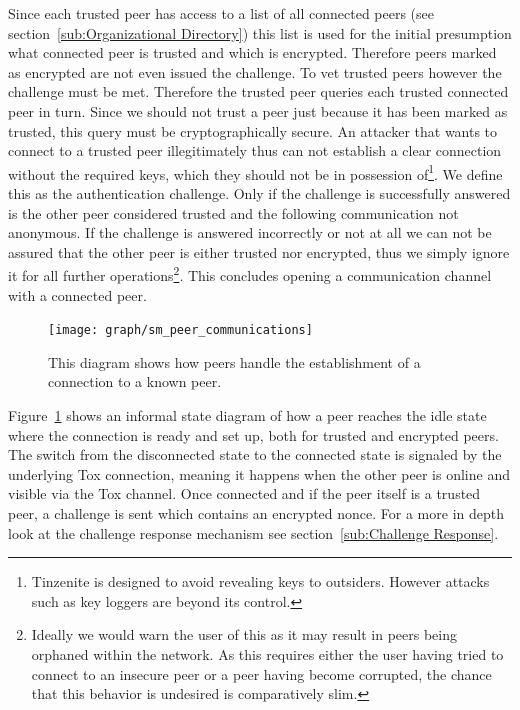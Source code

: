 Since each trusted peer has access to a list of all connected peers (see section~\ref{sub:Organizational Directory}) this list is used for the initial presumption what connected peer is trusted and which is encrypted.
Therefore peers marked as encrypted are not even issued the challenge.
To vet trusted peers however the challenge must be met.
Therefore the trusted peer queries each trusted connected peer in turn.
Since we should not trust a peer just because it has been marked as trusted, this query must be cryptographically secure.
An attacker that wants to connect to a trusted peer illegitimately thus can not establish a clear connection without the required keys, which they should not be in possession of\footnote{Tinzenite is designed to avoid revealing keys to outsiders. However attacks such as key loggers are beyond its control.}.
We define this as the authentication challenge.
Only if the challenge is successfully answered is the other peer considered trusted and the following communication not anonymous.
If the challenge is answered incorrectly or not at all we can not be assured that the other peer is either trusted nor encrypted, thus we simply ignore it for all further operations\footnote{Ideally we would warn the user of this as it may result in peers being orphaned within the network. As this requires either the user having tried to connect to an insecure peer or a peer having become corrupted, the chance that this behavior is undesired is comparatively slim.}.
This concludes opening a communication channel with a connected peer.

\begin{figure}[htp]
\centering
    \texttt{[image: graph/sm\_peer\_communications]}
\caption[Connection State Diagram]{This diagram shows how peers handle the establishment of a connection to a known peer.}
\label{graph:connection_states}
\end{figure}

Figure~\ref{graph:connection_states} shows an informal state diagram of how a peer reaches the idle state where the connection is ready and set up, both for trusted and encrypted peers.
The switch from the disconnected state to the connected state is signaled by the underlying Tox connection, meaning it happens when the other peer is online and visible via the Tox channel.
Once connected and if the peer itself is a trusted peer, a challenge is sent which contains an encrypted nonce.
For a more in depth look at the challenge response mechanism see section~\ref{sub:Challenge Response}.

